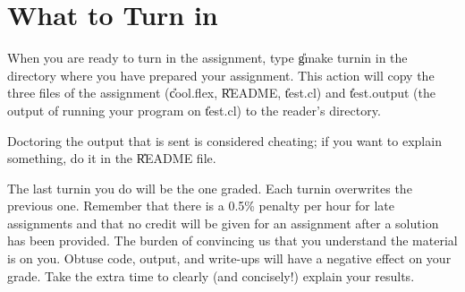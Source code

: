 \section{What to Turn in}

When you are ready to turn in the assignment, type \U{gmake turnin} in
the directory where you have prepared your assignment.  This action
will copy the three files of the assignment (\U{cool.flex},
\U{README}, \U{test.cl}) and
\U{test.output} (the output
of running your program on \U{test.cl}) to the reader's
directory.

Doctoring the output that is sent is considered cheating; if you want
to explain something, do it in the \U{README} file.

The last turnin you do will be the one graded.
Each turnin overwrites the previous one.  Remember that there is a
0.5\% penalty per hour for late assignments and that no credit will be
given for an assignment after a solution has been provided.
The burden of convincing us that you understand the material is on you.
Obtuse code, output, and write-ups will have a negative effect on your
grade. Take the extra time to clearly (and concisely!) explain your results.




